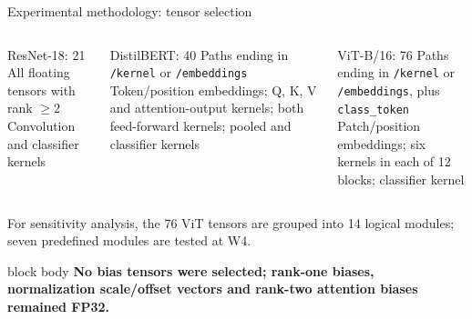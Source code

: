 \documentclass[aspectratio=169,10pt]{beamer}
\begin{document}
\begin{frame}{Experimental methodology: tensor selection}
\begin{center}
\end{center}
\vspace{1mm}
\begin{columns}[T,onlytextwidth]
\begin{block}{ResNet-18: 21}
\centering\scriptsize
All floating tensors with rank $\geq2$\\[1mm]
Convolution and classifier kernels
\end{block}
\begin{block}{DistilBERT: 40}
\centering\scriptsize
Paths ending in \texttt{/kernel} or \texttt{/embeddings}\\[1mm]
Token/position embeddings; Q, K, V and attention-output kernels; both feed-forward kernels; pooled and classifier kernels
\end{block}
\begin{block}{ViT-B/16: 76}
\centering\scriptsize
Paths ending in \texttt{/kernel} or \texttt{/embeddings}, plus \texttt{class\_token}\\[1mm]
Patch/position embeddings; six kernels in each of 12 blocks; classifier kernel
\end{block}
\end{columns}
\vspace{1mm}
\begin{center}\scriptsize For sensitivity analysis, the 76 ViT tensors are grouped into 14 logical modules; seven predefined modules are tested at W4.\end{center}
\begin{beamercolorbox}[wd=\textwidth,sep=1mm,rounded=true]{block body}\centering\scriptsize\bfseries
No bias tensors were selected; rank-one biases, normalization scale/offset vectors and rank-two attention biases remained FP32.
\end{beamercolorbox}
\end{frame}
\end{document}
